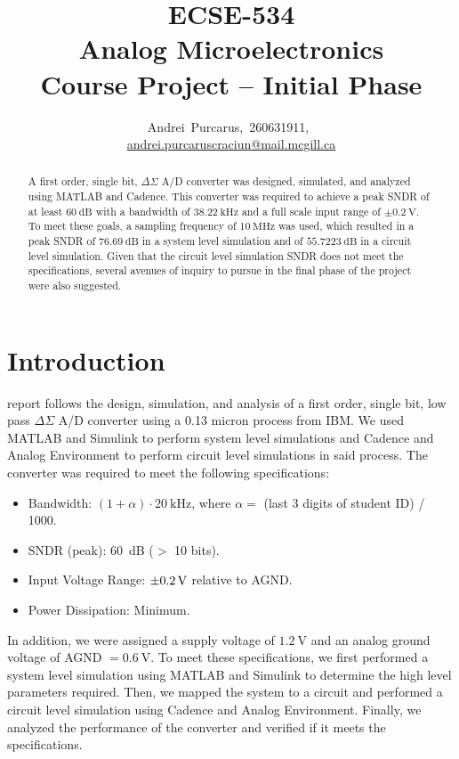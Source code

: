\documentclass[journal,hidelinks]{IEEEtran}
\title{ECSE-534 \\ Analog Microelectronics \\ Course Project -- Initial Phase}
\author{Andrei~Purcarus,~260631911,~\IEEEmembership{McGill~University} \\ \href{mailto:andrei.purcaruscraciun@mail.mcgill.ca}{andrei.purcaruscraciun@mail.mcgill.ca}}
\begin{document}
\sloppy

\maketitle

\begin{abstract}

A first order, single bit, $\Delta \Sigma$ A/D converter was designed, simulated, and analyzed using MATLAB and Cadence. This converter was required to achieve a peak SNDR of at least $\SI{60}{\deci\bel}$ with a bandwidth of $\SI{38.22}{\kilo\hertz}$ and a full scale input range of $\pm \SI{0.2}{\volt}$. To meet these goals, a sampling frequency of $\SI{10}{\mega\hertz}$ was used, which resulted in a peak SNDR of $\SI{76.69}{\deci\bel}$ in a system level simulation and of $\SI{55.7223}{\deci\bel}$ in a circuit level simulation. Given that the circuit level simulation SNDR does not meet the specifications, several avenues of inquiry to pursue in the final phase of the project were also suggested.

\end{abstract}

\section{Introduction}

 report follows the design, simulation, and analysis of a first order, single bit, low pass $\Delta \Sigma$ A/D converter using a 0.13 micron process from IBM. We used MATLAB and Simulink to perform system level simulations and Cadence and Analog Environment to perform circuit level simulations in said process. The converter was required to meet the following specifications:
\begin{itemize}
  \item Bandwidth: $(1 + \alpha) \cdot \SI{20}{\kilo\hertz}$, where $\alpha =$ (last 3 digits of student ID) / 1000.
  \item SNDR (peak): \SI{60}{\deci\bel} ($>$ 10 bits).
  \item Input Voltage Range: $\SI{\pm 0.2}{\volt}$ relative to AGND.
  \item Power Dissipation: Minimum.
\end{itemize}

In addition, we were assigned a supply voltage of $\SI{1.2}{\volt}$ and an analog ground voltage of AGND $= \SI{0.6}{\volt}$. To meet these specifications, we first performed a system level simulation using MATLAB and Simulink to determine the high level parameters required. Then, we mapped the system to a circuit and performed a circuit level simulation using Cadence and Analog Environment. Finally, we analyzed the performance of the converter and verified if it meets the specifications.
\end{document}
